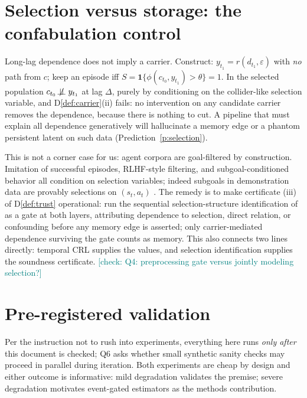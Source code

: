 \documentclass[11pt]{article}
\newcommand{\nindep}{\not\!\perp\!\!\!\perp}
\newcommand{\checkY}[1]{\textcolor{teal}{\footnotesize [check: #1]}}
\theoremstyle{plain}
\theoremstyle{definition}
\begin{document}
\section{Selection versus storage: the confabulation control}\label{sec:selection}

Long-lag dependence does not imply a carrier. Construct: $y_{t_1} = r(d_{t_1}, \varepsilon)$ with \emph{no} path from $c$; keep an episode iff $S = \mathbf{1}\{\phi(c_{t_0}, y_{t_1}) > \theta\} = 1$. In the selected population $c_{t_0} \nindep y_{t_1}$ at lag $\Delta$, purely by conditioning on the collider-like selection variable, and D\ref{def:carrier}(ii) fails: no intervention on any candidate carrier removes the dependence, because there is nothing to cut. A pipeline that must explain all dependence generatively will hallucinate a memory edge or a phantom persistent latent on such data (Prediction~\ref{p:selection}).

This is not a corner case for us: agent corpora are goal-filtered by construction. Imitation of successful episodes, RLHF-style filtering, and subgoal-conditioned behavior all condition on selection variables; indeed subgoals in demonstration data are provably selections on $(s_t, a_t)$ \cite{qiu2024subtask}. The remedy is to make certificate (iii) of D\ref{def:trust} operational: run the sequential selection-structure identification of \cite{zheng2024selection} as a gate at both layers, attributing dependence to selection, direct relation, or confounding before any memory edge is asserted; only carrier-mediated dependence surviving the gate counts as memory. This also connects two lines directly: temporal CRL supplies the values, and selection identification supplies the soundness certificate. \checkY{Q4: preprocessing gate versus jointly modeling selection?}

\section{Pre-registered validation}\label{sec:exp}

Per the instruction not to rush into experiments, everything here runs \emph{only after} this document is checked; Q6 asks whether small synthetic sanity checks may proceed in parallel during iteration. Both experiments are cheap by design and either outcome is informative: mild degradation validates the premise; severe degradation motivates event-gated estimators as the methods contribution.
\end{document}
